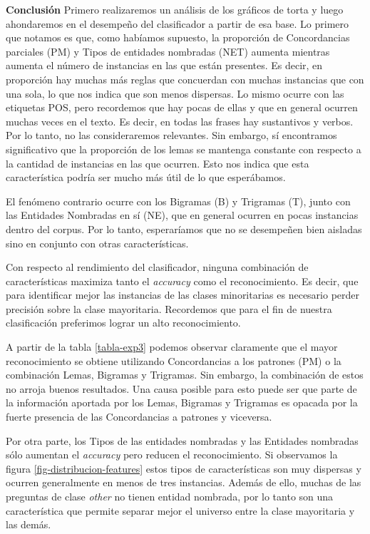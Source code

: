 \textbf{Conclusión} Primero realizaremos un análisis de los gráficos de torta y luego ahondaremos en el desempeño del clasificador a partir de esa base. Lo primero que notamos es que, como habíamos supuesto, la proporción de Concordancias parciales (PM) y Tipos de entidades nombradas (NET) aumenta mientras aumenta el número de instancias en las que están presentes. Es decir, en proporción hay muchas más reglas que concuerdan con muchas instancias que con una sola, lo que nos indica que son menos dispersas. Lo mismo ocurre con las etiquetas POS, pero recordemos que hay pocas de ellas y que en general ocurren muchas veces en el texto. Es decir, en todas las frases hay sustantivos y verbos. Por lo tanto, no las consideraremos relevantes. Sin embargo, sí encontramos significativo que la proporción de los lemas se mantenga constante con respecto a la cantidad de instancias en las que ocurren. Esto nos indica que esta característica podría ser mucho más útil de lo que esperábamos.

El fenómeno contrario ocurre con los Bigramas (B) y Trigramas (T), junto con las Entidades Nombradas en sí (NE), que en general ocurren en pocas instancias dentro del corpus. Por lo tanto, esperaríamos que no se desempeñen bien aisladas sino en conjunto con otras características.

Con respecto al rendimiento del clasificador, ninguna combinación de características maximiza tanto el \textit{accuracy} como el reconocimiento. Es decir, que para identificar mejor las instancias de las clases minoritarias es necesario perder precisión sobre la clase mayoritaria. Recordemos que para el fin de nuestra clasificación preferimos lograr un alto reconocimiento.

A partir de la tabla \ref{tabla-exp3} podemos observar claramente que el mayor reconocimiento se obtiene utilizando Concordancias a los patrones (PM) o la combinación Lemas, Bigramas y Trigramas. Sin embargo, la combinación de estos no arroja buenos resultados. Una causa posible para esto puede ser que parte de la información aportada por los Lemas, Bigramas y Trigramas es opacada por la fuerte presencia de las Concordancias a patrones y viceversa.

Por otra parte, los Tipos de las entidades nombradas y las Entidades nombradas sólo aumentan el \textit{accuracy} pero reducen el reconocimiento. Si observamos la figura \ref{fig-distribucion-features} estos tipos de características son muy dispersas y ocurren generalmente en menos de tres instancias. Además de ello, muchas de las preguntas de clase \textit{other} no tienen entidad nombrada, por lo tanto son una característica que permite separar mejor el universo entre la clase mayoritaria y las demás.

